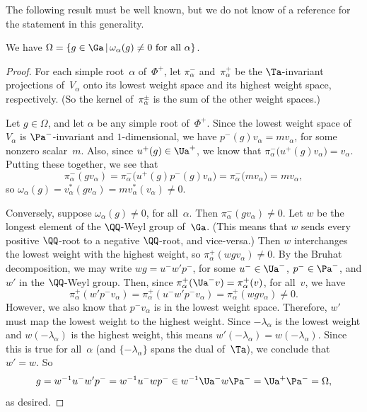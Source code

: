 The following result must be well known, but we do not know of a reference for the statement in this generality.

\begin{lem}[cf.\ {\cite[Lemma~4.11(i)]{MR1828742}}] \label{OmegaIdeal}
We have $\Omega = \{ g \in \Ga \,|\, \text{$\omega_\alpha(g) \neq 0$ for all~$\alpha$} \} $.
\end{lem}

\begin{proof}
For each simple root~$\alpha$ of~$\Phi^+$, let $\pi^-_\alpha$ and~$\pi^+_\alpha$ be the $\Ta$-invariant projections of~$V_\alpha$ onto its lowest weight space and its highest weight space, respectively. (So the kernel of~$\pi^\pm_\alpha$ is the sum of the other weight spaces.)

Let $g \in \Omega$, and let $\alpha$ be any simple root of~$\Phi^+$. Since the lowest weight space of~$V_\alpha$ is $\Pa^-$-invariant and $1$-dimensional, we have $p^-(g) v_\alpha = m v_\alpha$, for some nonzero scalar~$m$. Also, since $u^+(g) \in \Ua^+$, we know that $\pi^-_\alpha \bigl( u^+(g) v_\alpha \bigr) = v_\alpha$. Putting these together, we see that
	\[ \pi^-_\alpha(gv_\alpha)
	= \pi^-_\alpha \bigl( u^+(g) p^-(g) v_\alpha \bigr)
	= \pi^-_\alpha \bigl( m v_\alpha \bigr)
	= m v_\alpha, \]
so $\omega_\alpha(g) = v_\alpha^*( g v_\alpha) = m v_\alpha^*( v_\alpha) \neq 0$.

Conversely, suppose $\omega_\alpha(g) \neq 0$, for all~$\alpha$.
Then $\pi^-_\alpha(g v_\alpha) \neq 0$.
Let $w$ be the longest element of the $\QQ$-Weyl group of~$\Ga$. (This means that $w$ sends every positive $\QQ$-root to a negative $\QQ$-root, and vice-versa.)
Then $w$ interchanges the lowest weight with the highest weight, so $\pi^+_\alpha(w g v_\alpha) \neq 0$.
By the Bruhat decomposition, we may write $w g = u^- w' p^-$, for some $u^- \in \Ua^-$, $p^- \in \Pa^-$, and $w'$ in the $\QQ$-Weyl group.
Then, since $\pi^+_\alpha(\Ua^- v) = \pi^+_\alpha(v)$, for all~$v$, we have
\[ \pi^+_\alpha(w' p^- v_\alpha)= \pi^+_\alpha(u^- w' p^- v_\alpha)= \pi^+_\alpha(w g v_\alpha)	\neq 0.
\]
However, we also know that $p^- v_\alpha$ is in the lowest weight space. Therefore, $w'$ must map the lowest weight to the highest weight. Since $-\lambda_\alpha$ is the lowest weight and $w(-\lambda_\alpha)$ is the highest weight, this means $w'(-\lambda_\alpha) = w(-\lambda_\alpha)$. Since this is true for all~$\alpha$ (and $\{-\lambda_\alpha\}$ spans the dual of~$\Ta$), we conclude that $w' = w$. So
	\[ g
	= w^{-1} u^- w' p^-
	= w^{-1} u^- w p^-
	\in w^{-1} \Ua^- w \Pa^-
	= \Ua^+ \Pa^-
	= \Omega
	, \]
as desired.
\end{proof}

